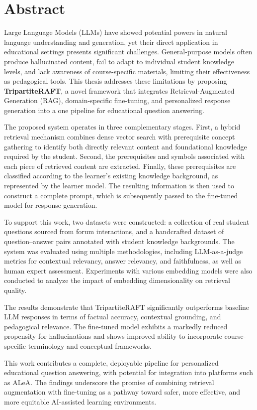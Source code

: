 \chapter*{Abstract}

Large Language Models (LLMs) have showed potential powers in natural language understanding and generation, yet their direct application in educational settings presents significant challenges. General-purpose models often produce hallucinated content, fail to adapt to individual student knowledge levels, and lack awareness of course-specific materials, limiting their effectiveness as pedagogical tools. This thesis addresses these limitations by proposing \textbf{TripartiteRAFT}, a novel framework that integrates Retrieval-Augmented Generation (RAG), domain-specific fine-tuning, and personalized response generation into a one pipeline for educational question answering.

The proposed system operates in three complementary stages. First, a hybrid retrieval mechanism combines dense vector search with prerequisite concept gathering to identify both directly relevant content and foundational knowledge required by the student. Second, the prerequisites and symbols associated with each piece of retrieved content are extracted. Finally, these prerequisites are classified according to the learner's existing knowledge background, as represented by the learner model. The resulting information is then used to construct a complete prompt, which is subsequently passed to the fine-tuned model for response generation.

To support this work, two datasets were constructed: a collection of real student questions sourced from forum interactions, and a handcrafted dataset of question--answer pairs annotated with student knowledge backgrounds. The system was evaluated using multiple methodologies, including LLM-as-a-judge metrics for contextual relevancy, answer relevancy, and faithfulness, as well as human expert assessment. Experiments with various embedding models were also conducted to analyze the impact of embedding dimensionality on retrieval quality.

The results demonstrate that TripartiteRAFT significantly outperforms baseline LLM responses in terms of factual accuracy, contextual grounding, and pedagogical relevance. The fine-tuned model exhibits a markedly reduced propensity for hallucinations and shows improved ability to incorporate course-specific terminology and conceptual frameworks.

This work contributes a complete, deployable pipeline for personalized educational question answering, with potential for integration into platforms such as ALeA. The findings underscore the promise of combining retrieval augmentation with fine-tuning as a pathway toward safer, more effective, and more equitable AI-assisted learning environments.